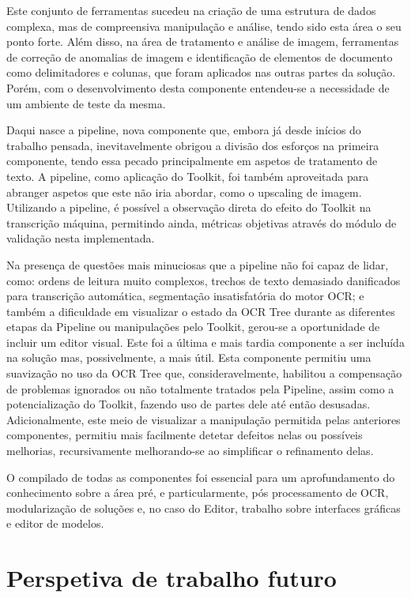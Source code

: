 Este conjunto de ferramentas sucedeu na criação de uma estrutura de dados complexa, mas de compreensiva manipulação e análise, tendo sido esta área o seu ponto forte. Além disso, na área de tratamento e análise de imagem, ferramentas de correção de anomalias de imagem e identificação de elementos de documento como delimitadores e colunas, que foram aplicados nas outras partes da solução. Porém, com o desenvolvimento desta componente entendeu-se a necessidade de um ambiente de teste da mesma. 

Daqui nasce a pipeline, nova componente que, embora já desde inícios do trabalho pensada, inevitavelmente obrigou a divisão dos esforços na primeira componente, tendo essa pecado principalmente em aspetos de tratamento de texto.
A pipeline, como aplicação do Toolkit, foi também aproveitada para abranger aspetos que este não iria abordar, como o upscaling de imagem. Utilizando a pipeline, é possível a observação direta do efeito do Toolkit na transcrição máquina, permitindo ainda, métricas objetivas através do módulo de validação nesta implementada.


Na presença de questões mais minuciosas que a pipeline não foi capaz de lidar, como: ordens de leitura muito complexos, trechos de texto demasiado danificados para transcrição automática, segmentação insatisfatória do motor OCR; e também a dificuldade em visualizar o estado da OCR Tree durante as diferentes etapas da Pipeline ou manipulações pelo Toolkit, gerou-se a oportunidade de incluir um editor visual. Este foi a última e mais tardia componente a ser incluída na solução mas, possivelmente, a mais útil. Esta componente permitiu uma suavização no uso da OCR Tree que, consideravelmente, habilitou a compensação de problemas ignorados ou não totalmente tratados pela Pipeline, assim como a potencialização do Toolkit, fazendo uso de partes dele até então desusadas. Adicionalmente, este meio de visualizar a manipulação permitida pelas anteriores componentes, permitiu mais facilmente detetar defeitos nelas ou possíveis melhorias, recursivamente melhorando-se ao simplificar o refinamento delas.

O compilado de todas as componentes foi essencial para um aprofundamento do conhecimento sobre a área pré, e particularmente, pós processamento de OCR, modularização de soluções e, no caso do Editor, trabalho sobre interfaces gráficas e editor de modelos.

\section{Perspetiva de trabalho futuro}

